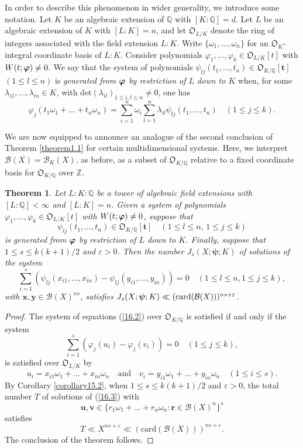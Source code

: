 \documentclass[12pt,reqno]{amsart}
\newtheorem{theorem}{Theorem}[section]
\theoremstyle{definition}
\theoremstyle{remark}
\numberwithin{equation}{section}
\def\bfr{{\mathbf r}}
\def\bft{{\mathbf t}}
\def\bfu{{\mathbf u}}
\def\bfv{{\mathbf v}}
\def\bfx{{\mathbf x}}
\def\bfy{{\mathbf y}}
\def\calB{{\mathcal B}} \def\calBtil{{\widetilde \calB}}
\def\dbZ{{\mathbb Z}}\def\dbQ{{\mathbb Q}}
\def\grO{{\mathfrak O}}
\def\lam{{\lambda}} \def\Lam{{\Lambda}} \def\Lamtil{{\widetilde \Lambda}}
\def\bfpsi{{\boldsymbol \psi}} \def\bfPsi{{\boldsymbol \Psi}}
\def\ome{{\omega}} \def\Ome{{\Omega}}
\def\eps{\varepsilon}
\def\le{\leqslant} \def\ge{\geqslant} \def\pleq{\preccurlyeq} \def\ple{\prec}
\begin{document}
In order to describe this phenomenon in wider generality, we introduce some notation. Let 
$K$ be an algebraic extension of $\dbQ$ with $[K:\dbQ]=d$. Let $L$ be an algebraic 
extension of $K$ with $[L:K]=n$, and let $\grO_{L/K}$ denote the ring of integers 
associated with the field extension $L:K$. Write $\{\ome_1,\ldots ,\ome_n\}$ for an 
$\grO_K$-integral coordinate basis of $L:K$. Consider polynomials 
$\varphi_1,\ldots ,\varphi_k\in \grO_{L/K}[t]$ with $W(t;{\boldsymbol \varphi})\ne 0$. We say that the 
system of polynomials $\psi_{lj}(t_1,\ldots ,t_n)\in \grO_{K/\dbQ}[\bft]$ $(1\le l\le n)$ is 
{\it generated from ${\boldsymbol \varphi}$ by restriction of $L$ down to $K$} when, for some 
$\lam_{i1},\ldots ,\lam_{in}\in K$, with $\text{det}(\lam_{il})_{1\le i,l\le n}\ne 0$, one has
$$\varphi_j(t_1\ome_1+\ldots +t_n\ome_n)=
\sum_{i=1}^n\ome_i\sum_{l=1}^n\lam_{il}\psi_{lj}(t_1,\ldots ,t_n)\quad (1\le j\le k).$$

\par We are now equipped to announce an analogue of the second conclusion of 
Theorem \ref{theorem1.1} for certain multidimensional systems. Here, we interpret 
$\calB(X)=\calB_K(X)$, as before, as a subset of $\grO_{K/\dbQ}$ relative to a fixed 
coordinate basis for $\grO_{K/\dbQ}$ over $\dbZ$.

\begin{theorem}\label{theorem16.1} Let $L:K:\dbQ$ be a tower of algebraic field 
extensions with $[L:\dbQ]<\infty$ and $[L:K]=n$. Given a system of polynomials 
$\varphi_1,\ldots ,\varphi_k\in \grO_{L/K}[t]$ with $W(t;{\boldsymbol \varphi})\ne 0$, suppose that 
$$\psi_{lj}(t_1,\ldots ,t_n)\in \grO_{K/\dbQ}[\bft]\quad (1\le l\le n,\, 1\le j\le k)$$
is generated from ${\boldsymbol \varphi}$ by restriction of $L$ down to $K$. Finally, suppose that 
$1\le s\le k(k+1)/2$ and $\eps>0$. Then the number $J_s(X;\bfpsi;K)$ of solutions of the 
system
\begin{equation}\label{16.2}
\sum_{i=1}^s\left( \psi_{lj}(x_{i1},\ldots ,x_{in})-\psi_{lj}(y_{i1},\ldots ,y_{in})\right)=0
\quad (1\le l\le n, 1\le j\le k),
\end{equation}
with $\bfx,\bfy\in \calB(X)^{ns}$, satisfies 
$J_s(X;\bfpsi;K)\ll ({\rm card}(\calB(X)))^{ns+\eps}$.
\end{theorem}

\begin{proof} The system of equations (\ref{16.2}) over $\grO_{K/\dbQ}$ is satisfied if 
and only if the system
\begin{equation}\label{16.3}
\sum_{i=1}^s\left( \varphi_j(u_i)-\varphi_j(v_i)\right)=0\quad (1\le j\le k),
\end{equation}
is satisfied over $\grO_{L/K}$ by
$$u_i=x_{i1}\ome_1+\ldots +x_{in}\ome_n\quad \text{and}\quad 
v_i=y_{i1}\ome_1+\ldots +y_{in}\ome_n\quad (1\le i\le s).$$
By Corollary \ref{corollary15.2}, when $1\le s\le k(k+1)/2$ and $\eps>0$, the total number 
$T$ of solutions of (\ref{16.3}) with 
$$\bfu,\bfv\in\{ r_1\ome_1+\ldots +r_n\ome_n:\bfr\in \calB(X)^n\}^s$$
satisfies
$$T\ll X^{ns+\eps}\ll (\text{card}(\calB(X)))^{ns+\eps}.$$
The conclusion of the theorem follows.
\end{proof}
\end{document}
